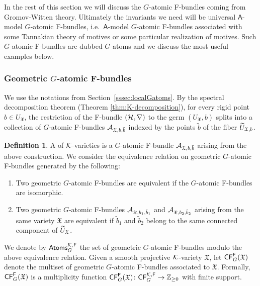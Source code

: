 \documentclass[twoside,leqno]{article}
\numberwithin{equation}{section}
\theoremstyle{plain}
\theoremstyle{definition}
\newtheorem{definition}[equation]{Definition}
\begin{document}
\medskip


In the rest of this section we will discuss the $G$-atomic F-bundles coming from Gromov-Witten theory.  Ultimately the invariants we need will be universal $\mathsf{A}$-model $G$-atomic F-bundles, i.e.\ $\mathsf{A}$-model $G$-atomic F-bundles  associated with some Tannakian theory of motives or some particular realization of motives.  Such $G$-atomic F-bundles are dubbed $G$-atoms and we discuss the most useful examples below. 

\subsubsection{Geometric $G$-atomic F-bundles} 

We use the notations from Section~\ref{sssec:localGatoms}.
By the spectral decomposition theorem (Theorem \ref{thm:K-decomposition}), for every rigid point $b \in U_{\mathfrak{X}}$,  the restriction of the F-bundle $(\mathcal H,\nabla)$ to the germ $(U_{\mathfrak{X}}, b)$ splits into a collection of $G$-atomic F-bundles $\mathcal A_{\mathfrak{X},b,\tilde b}$ indexed by the points $\tilde b$ of the fiber $\widetilde U_{\mathfrak{X},b}$.

\begin{definition} \label{def:G-atom} 
  A  of $\mathcal K$-varieties is a $G$-atomic F-bundle $\mathcal A_{\mathfrak{X},b,\tilde b}$ arising from the above construction.  We consider the equivalence relation on geometric $G$-atomic F-bundles generated by the following:
  \begin{enumerate}
    \item Two geometric $G$-atomic F-bundles are equivalent if the $G$-atomic F-bundles are isomorphic.
    \item Two geometric $G$-atomic F-bundles $\mathcal A_{\mathfrak{X},b_1,\tilde b_1}$ and $\mathcal A_{\mathfrak{X},b_2,\tilde b_2}$ arising from the same variety $\mathfrak{X}$ are equivalent if $\tilde b_1$ and $\tilde b_2$ belong to the same connected component of $\widetilde U_{\mathfrak{X}}$.
  \end{enumerate}
  We denote by $\mathsf{Atoms}_{G}^{\mathcal K,\mathsf{F}}$ the set of geometric $G$-atomic F-bundles modulo the above equivalence relation.
  Given a smooth projective $\mathcal K$-variety $\mathfrak{X}$, let $\mathsf{CF}_G^{\mathsf{F}}(\mathfrak{X})$ denote the multiset of geometric $G$-atomic F-bundles associated to $\mathfrak{X}$.
  Formally, $\mathsf{CF}_G^{\mathsf{F}}(\mathfrak{X})$  is a multiplicity function $
  \mathsf{CF}_G^{\mathsf{F}}(\mathfrak{X}) \colon \mathsf{CF}_G^{\mathcal K,\mathsf{F}}  \to \mathbb Z_{\geq 0}$ with finite support.
\end{definition}
\end{document}
